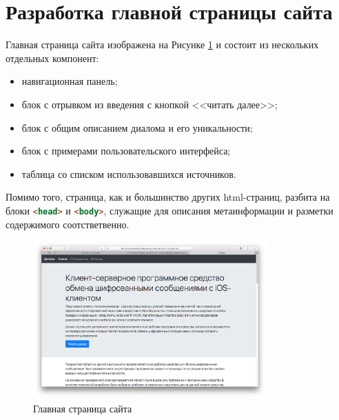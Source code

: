 \section{Разработка главной страницы сайта}
\label{sec:practice}

Главная страница сайта изображена на Рисунке \ref{img:mainpage} и состоит из нескольких отдельных компонент:
\begin{itemize}
	\item навигационная панель;
	\item блок с отрывком из введения с кнопкой <<читать далее>>;
	\item блок с общим описанием диалома и его уникальности;
	\item блок с примерами пользовательского интерфейса;
	\item таблица со списком использовавшихся источников.
\end{itemize}

Помимо того, страница, как и большинство других \gls{html}-страниц, разбита на блоки \lstinline[language=HTML]{<head>} и \lstinline[language=HTML]{<body>}, служащие для описания метаинформации и разметки содержимого соотстветвенно.

\begin{figure}[h]
  \centering
    \includegraphics[width=0.8\textwidth]{inc/img/title}
  \caption{Главная страница сайта}
  \label{img:mainpage}
\end{figure}